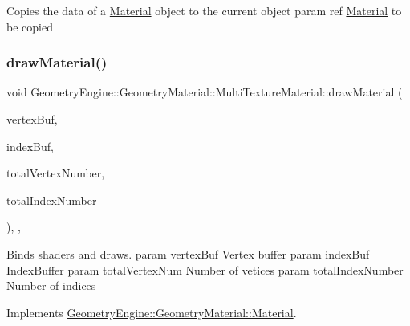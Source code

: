 Copies the data of a \mbox{\hyperlink{class_geometry_engine_1_1_geometry_material_1_1_material}{Material}} object to the current object param ref \mbox{\hyperlink{class_geometry_engine_1_1_geometry_material_1_1_material}{Material}} to be copied \mbox{\label{class_geometry_engine_1_1_geometry_material_1_1_multi_texture_material_af6edaa5960d07b6abee870760e869189}} 
\subsubsection{\texorpdfstring{drawMaterial()}{drawMaterial()}}
{\footnotesize\ttfamily void Geometry\+Engine\+::\+Geometry\+Material\+::\+Multi\+Texture\+Material\+::draw\+Material (\begin{DoxyParamCaption}\item[{Q\+Open\+G\+L\+Buffer $\ast$}]{vertex\+Buf,  }\item[{Q\+Open\+G\+L\+Buffer $\ast$}]{index\+Buf,  }\item[{unsigned int}]{total\+Vertex\+Number,  }\item[{unsigned int}]{total\+Index\+Number }\end{DoxyParamCaption})\hspace{0.3cm}{\ttfamily [override]}, {\ttfamily [protected]}, {\ttfamily [virtual]}}

Binds shaders and draws. param vertex\+Buf Vertex buffer param index\+Buf Index\+Buffer param total\+Vertex\+Num Number of vetices param total\+Index\+Number Number of indices 

Implements \mbox{\hyperlink{class_geometry_engine_1_1_geometry_material_1_1_material_a0070eab6e5fe86dc05dc69f2e37b9072}{Geometry\+Engine\+::\+Geometry\+Material\+::\+Material}}.

\mbox{\label{class_geometry_engine_1_1_geometry_material_1_1_multi_texture_material_a2679c169c654bb65728ef21db60d5637}} 
